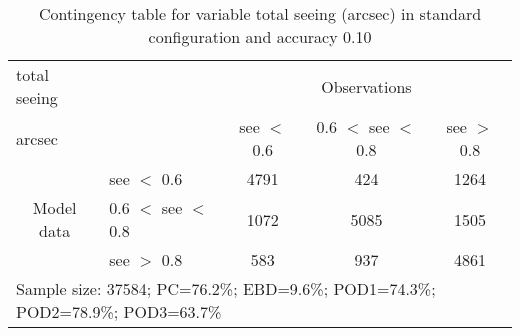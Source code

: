 \begin{table}[]
\begin{center}
\begin{tabular}{llccc}
\hline
{total seeing}                                       &                                                    & \multicolumn{3}{c}{Observations}                 \\
{arcsec}                                       &                             & see $<$ 0.6   & 0.6 $<$ see $<$ 0.8 & see $>$ 0.8 \\
\hline
\multicolumn{1}{c}{\multirow{3}{*}{Model data}}  & see $<$ 0.6             & 4791                & 424                       & 1264              \\
                                                 & 0.6  $<$ see $<$ 0.8 & 1072                & 5085                       & 1505              \\
                                                 & see $>$ 0.8             & 583                & 937                       & 4861              \\
\hline
\multicolumn{5}{l}{Sample size: 37584; PC=76.2\%; EBD=9.6\%; POD1=74.3\%; POD2=78.9\%; POD3=63.7\%}
\end{tabular}
\end{center}
\caption{Contingency table for variable total seeing (arcsec) in standard configuration and accuracy 0.10}
\label{tab:contingencyseeBEF}
\end{table}
